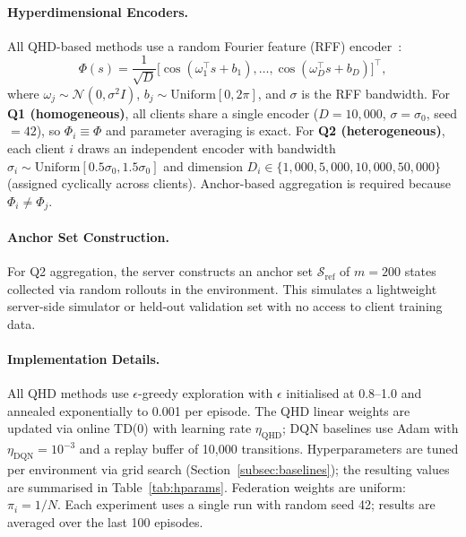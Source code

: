 \paragraph{Hyperdimensional Encoders.}
All QHD-based methods use a random Fourier feature (RFF) encoder~\cite{rahimi2007random}:
\begin{equation}
\Phi(s) = \frac{1}{\sqrt{D}}\bigl[\cos(\omega_1^\top s + b_1),\dots,\cos(\omega_D^\top s + b_D)\bigr]^\top,
\end{equation}
where $\omega_j \sim \mathcal{N}(0, \sigma^2 I)$, $b_j \sim \mathrm{Uniform}[0, 2\pi]$, and $\sigma$ is the RFF bandwidth.
For \textbf{Q1 (homogeneous)}, all clients share a single encoder ($D=10{,}000$, $\sigma=\sigma_0$, seed $=42$), so $\Phi_i \equiv \Phi$ and parameter averaging is exact.
For \textbf{Q2 (heterogeneous)}, each client $i$ draws an independent encoder with bandwidth $\sigma_i \sim \mathrm{Uniform}[0.5\sigma_0, 1.5\sigma_0]$ and dimension $D_i \in \{1{,}000, 5{,}000, 10{,}000, 50{,}000\}$ (assigned cyclically across clients). Anchor-based aggregation is required because $\Phi_i \neq \Phi_j$.

\paragraph{Anchor Set Construction.}
For Q2 aggregation, the server constructs an anchor set $\mathcal{S}_\mathrm{ref}$ of $m=200$ states collected via random rollouts in the environment. This simulates a lightweight server-side simulator or held-out validation set with no access to client training data.

\paragraph{Implementation Details.}
All QHD methods use $\epsilon$-greedy exploration with $\epsilon$ initialised at 0.8--1.0 and annealed exponentially to 0.001 per episode. The QHD linear weights are updated via online TD($0$) with learning rate $\eta_\mathrm{QHD}$; DQN baselines use Adam with $\eta_\mathrm{DQN}=10^{-3}$ and a replay buffer of 10,000 transitions. Hyperparameters are tuned per environment via grid search (Section~\ref{subsec:baselines}); the resulting values are summarised in Table~\ref{tab:hparams}. Federation weights are uniform: $\pi_i = 1/N$. Each experiment uses a single run with random seed 42; results are averaged over the last 100 episodes.

